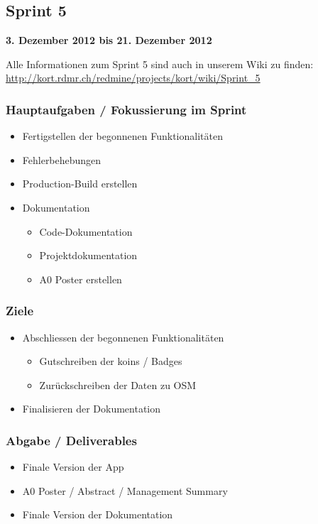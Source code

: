 \subsection{Sprint 5}

\textbf{3. Dezember 2012 bis 21. Dezember 2012}

Alle Informationen zum Sprint 5 sind auch in unserem Wiki zu finden:
\url{http://kort.rdmr.ch/redmine/projects/kort/wiki/Sprint_5}

\subsubsection{Hauptaufgaben / Fokussierung im Sprint}

\begin{itemize}
	\item Fertigstellen der begonnenen Funktionalitäten
	\item Fehlerbehebungen
	\item Production-Build erstellen
	\item Dokumentation
	\begin{itemize}
		\item Code-Dokumentation
		\item Projektdokumentation
		\item A0 Poster erstellen
	\end{itemize}
\end{itemize}

\subsubsection{Ziele}
\begin{itemize}
	\item Abschliessen der begonnenen Funktionalitäten
	\begin{itemize}
		\item Gutschreiben der koins / Badges
		\item Zurückschreiben der Daten zu OSM
	\end{itemize}
	\item Finalisieren der Dokumentation
\end{itemize}

\subsubsection{Abgabe / Deliverables}

\begin{itemize}
	\item Finale Version der App
	\item A0 Poster / Abstract / Management Summary
	\item Finale Version der Dokumentation
\end{itemize}

